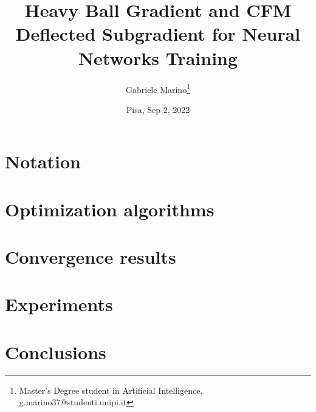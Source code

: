 \documentclass[a4paper]{article}
\title{Heavy Ball Gradient and CFM Deflected Subgradient for Neural Networks Training}
\author{Gabriele Marino\footnote{Master's Degree student in Artificial Intelligence, g.marino37@studenti.unipi.it}}
\date{Pisa, Sep 2, 2022}
\begin{document}
\maketitle

\setcounter{page}{2}



\def \b {\mathbf{b}}
\def \W {\mathbf{W}}
\def \h {\mathbf{h}}
\def \o {\mathbf{o}}
\def \L {\mathcal{L}}
\def \D {\mathcal{D}}
\def \d {\mathbf{d}}
\def \M {\mathcal{M}}
\def \X {\mathbf{X}}
\def \Y {\mathbf{Y}}
\def \Yh {\hat{\mathbf{Y}}}
\def \x {\mathbf{x}}
\def \y {\mathbf{y}}
\def \yh {\hat{\mathbf{y}}}
\def \g {\mathbf{g}}
\def \R {\mathbb{R}}

\section{Notation}
\label{notation}


\section{Optimization algorithms}
\label{algorithms}


\section{Convergence results}
\label{convergence}


\section{Experiments}
\label{experiments}


\section{Conclusions}
\label{conclusions}



\end{document}

